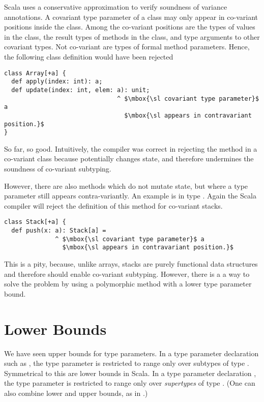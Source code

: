Scala uses a conservative approximation to verify soundness of
variance annotations.  A covariant type parameter of a class may only
appear in co-variant positions inside the class.  Among the co-variant
positions are the types of values in the class, the result types of
methods in the class, and type arguments to other covariant types. Not
co-variant are types of formal method parameters. Hence, the following
class definition would have been rejected
\begin{lstlisting}
class Array[+a] {
  def apply(index: int): a;
  def update(index: int, elem: a): unit;
                               ^ $\mbox{\sl covariant type parameter}$ a
                                 $\mbox{\sl appears in contravariant position.}$
}
\end{lstlisting}
So far, so good. Intuitively, the compiler was correct in rejecting
the  method in a co-variant class because 
potentially changes state, and therefore undermines the soundness of
co-variant subtyping. 

However, there are also methods which do not mutate state, but where a
type parameter still appears contra-variantly. An example is
 in type . Again the Scala compiler will reject
the definition of this method for co-variant stacks.
\begin{lstlisting}
class Stack[+a] {
  def push(x: a): Stack[a] = 
              ^ $\mbox{\sl covariant type parameter}$ a
                $\mbox{\sl appears in contravariant position.}$
\end{lstlisting}
This is a pity, because, unlike arrays, stacks are purely functional data
structures and therefore should enable co-variant subtyping. However,
there is a a way to solve the problem by using a polymorphic method
with a lower type parameter bound.

\section{Lower Bounds}

We have seen upper bounds for type parameters. In a type parameter
declaration such as , the type parameter  is
restricted to range only over subtypes of type . Symmetrical
to this are lower bounds in Scala. In a type parameter declaration
, the type parameter  is restricted to range only
over {\em supertypes} of type . (One can also combine lower and
upper bounds, as in .)

